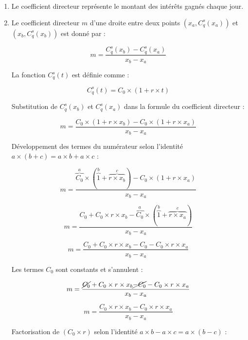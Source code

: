 \documentclass{article}
\begin{document}
\begin{enumerate}[label=\textbf{R1.\arabic*}]
                \item Le coefficient directeur représente le montant des intérêts gagnés chaque jour.

                \item Le coefficient directeur \( m \) d'une droite entre deux points \((x_a, C_q^s(x_a))\) et \((x_b, C_q^s(x_b))\) est donné par :

                \[
                m = \frac{C_q^s(x_b) - C_q^s(x_a)}{x_b - x_a}
                \]

                La fonction \( C_q^s(t) \) est définie comme :

                \[
                C_q^s(t) = C_0 \times \left(1 + r \times t\right)
                \]

                Substitution de \( C_q^s(x_b) \) et \( C_q^s(x_a) \) dans la formule du coefficient directeur :

                \[
                    m = \frac{C_0 \times \left(1 + r \times x_b\right) - C_0 \times \left(1 + r \times x_a\right)}{x_b - x_a}
                \]

                Développement des termes du numérateur selon l'identité $a \times (b + c) = a \times b + a \times c$ :

                \[
                    m = \frac{\overset{a}{\overbrace{C_0}} \times (\overset{b}{\overbrace{1}} + \overset{c}{\overbrace{r \times x_b}}) - C_0 \times (1 + r \times x_a)}{x_b - x_a}
                \]

                \[
                    m = \frac{C_0 + C_0 \times r \times x_b - \overset{a}{\overbrace{C_0}} \times (\overset{b}{\overbrace{1}} + \overset{c}{\overbrace{r \times x_a}})}{x_b - x_a}
                \]

                \[
                    m = \frac{C_0 + C_0 \times r \times x_b - C_0 - C_0 \times r \times x_a}{x_b - x_a}
                \]

                Les termes \( C_0 \) sont constants et s'annulent :

                \[
                    m = \frac{\cancel{C_0} + C_0 \times r \times x_b \cancel{- C_0} - C_0 \times r \times x_a}{x_b - x_a}
                \]

                \[
                    m = \frac{C_0 \times r \times x_b - C_0 \times r \times x_a}{x_b - x_a}
                \]

                Factorisation de $(C_0 \times r)$ selon l'identité $a \times b - a \times c = a \times (b-c)$ :


\end{enumerate}
\end{document}
